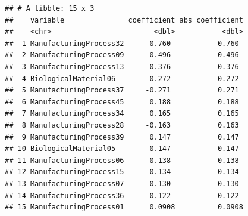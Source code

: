 \documentclass[
  11pt,
]{article}
\newenvironment{Shaded}{\begin{snugshade}}{\end{snugshade}}
\newcommand{\AttributeTok}[1]{\textcolor[rgb]{0.13,0.29,0.53}{#1}}
\newcommand{\DecValTok}[1]{\textcolor[rgb]{0.00,0.00,0.81}{#1}}
\newcommand{\FunctionTok}[1]{\textcolor[rgb]{0.13,0.29,0.53}{\textbf{#1}}}
\newcommand{\NormalTok}[1]{#1}
\newcommand{\OtherTok}[1]{\textcolor[rgb]{0.56,0.35,0.01}{#1}}
\newcommand{\SpecialCharTok}[1]{\textcolor[rgb]{0.81,0.36,0.00}{\textbf{#1}}}
\newcommand{\StringTok}[1]{\textcolor[rgb]{0.31,0.60,0.02}{#1}}
\begin{document}
\begin{Shaded}
\end{Shaded}

\begin{verbatim}
## # A tibble: 15 x 3
##    variable               coefficient abs_coefficient
##    <chr>                        <dbl>           <dbl>
##  1 ManufacturingProcess32      0.760           0.760 
##  2 ManufacturingProcess09      0.496           0.496 
##  3 ManufacturingProcess13     -0.376           0.376 
##  4 BiologicalMaterial06        0.272           0.272 
##  5 ManufacturingProcess37     -0.271           0.271 
##  6 ManufacturingProcess45      0.188           0.188 
##  7 ManufacturingProcess34      0.165           0.165 
##  8 ManufacturingProcess28     -0.163           0.163 
##  9 ManufacturingProcess39      0.147           0.147 
## 10 BiologicalMaterial05        0.147           0.147 
## 11 ManufacturingProcess06      0.138           0.138 
## 12 ManufacturingProcess15      0.134           0.134 
## 13 ManufacturingProcess07     -0.130           0.130 
## 14 ManufacturingProcess36     -0.122           0.122 
## 15 ManufacturingProcess01      0.0908          0.0908
\end{verbatim}
\end{document}
